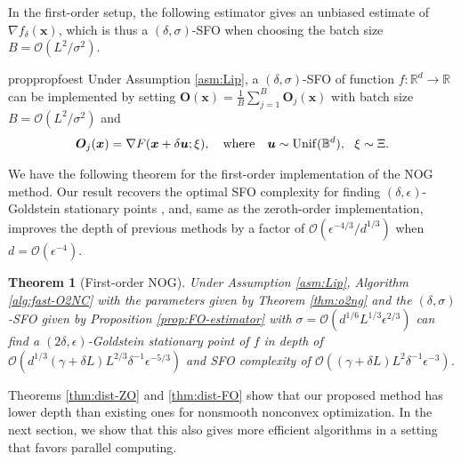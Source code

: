 \documentclass{article}
\def\vu{{\bm{u}}}
\def\vx{{\bm{x}}}
\def\mO{{\bm{O}}}
\def\gO{{\mathcal{O}}}
\def\sB{{\mathbb{B}}}
\def\sR{{\mathbb{R}}}
\newtheorem{thm}{Theorem}[section]
\theoremstyle{definition}
\theoremstyle{remark}
\begin{document}
	
	In the first-order setup, the following estimator \citep{duchi2012randomized,yousefian2012stochastic,sahinoglu2024online} gives an unbiased estimate of $\nabla f_\delta(\vx)$, which is thus a $(\delta, \sigma)$-SFO when choosing the batch size $B = \gO(L^2/\sigma^2)$.
	
	\begin{restatable}{prop}{propfoest} \label{prop:FO-estimator}
		Under Assumption \ref{asm:Lip},
		a $(\delta, \sigma)$-SFO of function $f:\sR^d \rightarrow \sR$ can be implemented by setting $\mO(\vx) = \frac{1}{B} \sum_{j=1}^B \mO_j(\vx)$ with batch size $B = \gO( L^2/ \sigma^2)$ and 
		\begin{align*}
			\mO_j(\vx) = \nabla F (\vx+ \delta \vu; \xi), \quad {\rm where} \quad \vu \sim {\rm Unif}(\sB^d), ~~ \xi \sim \Xi.
		\end{align*}
	\end{restatable}
	
	We have the following theorem for the first-order implementation of the NOG method. Our result recovers the optimal SFO complexity for finding $(\delta,\epsilon)$-Goldstein stationary points \citep{cutkosky2023optimal}, and, same as the zeroth-order implementation,  improves the depth of previous methods \citep{cutkosky2023optimal} by a factor of $\gO(\epsilon^{-4/3} / d^{1/3})$ when $d = \gO(\epsilon^{-4})$.
	
	\begin{thm}[First-order NOG] \label{thm:parallel-FO}
		Under Assumption \ref{asm:Lip}, Algorithm \ref{alg:fast-O2NC} with the parameters given by Theorem \ref{thm:o2ng} and the $(\delta,\sigma)$-SFO given by Proposition \ref{prop:FO-estimator} with $\sigma = \gO(d^{1/6} L^{1/3} \epsilon^{2/3})$ 
		can find a $(2\delta,\epsilon)$-Goldstein stationary point of $f$ in depth of $\gO(d^{1/3} (\gamma + \delta L) L^{2/3} \delta^{-1} \epsilon^{-5/3})$ and SFO complexity of $\gO( (\gamma + \delta L) L^2 \delta^{-1} \epsilon^{-3}  )$.
	\end{thm}
	
	Theorems \ref{thm:dist-ZO} and \ref{thm:dist-FO} show that our proposed method has lower depth than existing ones for nonsmooth nonconvex optimization. In the next section, we show that this also gives more efficient algorithms in a setting that favors parallel computing.
	
\end{document}
